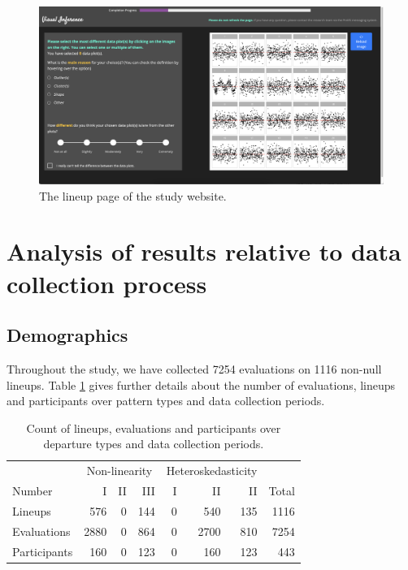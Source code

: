 \documentclass[]{interact}
\theoremstyle{plain}%
\theoremstyle{definition}
\theoremstyle{remark}
\begin{document}
\begin{figure}

{\centering \includegraphics[width=1\linewidth]{figures/lineup1} 

}

\caption{The lineup page of the study website.}\label{fig:lineup-page}
\end{figure}

\newpage

\hypertarget{analysis-of-results-relative-to-data-collection-process}{%
\section{Analysis of results relative to data collection
process}\label{analysis-of-results-relative-to-data-collection-process}}

\hypertarget{demographics}{%
\subsection{Demographics}\label{demographics}}

Throughout the study, we have collected 7254 evaluations on 1116
non-null lineups. Table \ref{tab:count-lineup} gives further details
about the number of evaluations, lineups and participants over pattern
types and data collection periods.

\begin{table}

\caption{\label{tab:count-lineup}Count of lineups, evaluations and participants over departure types and data collection periods.}
\centering
\begin{tabular}[t]{lrrrrrrr}
\toprule
\multicolumn{1}{c}{ } & \multicolumn{3}{c}{Non-linearity} & \multicolumn{3}{c}{Heteroskedasticity} \\
\cmidrule(l{3pt}r{3pt}){2-4} \cmidrule(l{3pt}r{3pt}){5-7}
Number & I & II & III & I & II & II & Total\\
\midrule
Lineups & 576 & 0 & 144 & 0 & 540 & 135 & 1116\\
Evaluations & 2880 & 0 & 864 & 0 & 2700 & 810 & 7254\\
Participants & 160 & 0 & 123 & 0 & 160 & 123 & 443\\
\bottomrule
\end{tabular}
\end{table}
\end{document}
